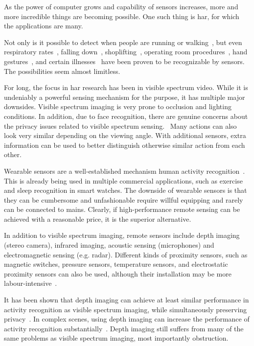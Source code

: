 As the power of computer grows and capability of sensors increases,
more and more incredible things are becoming possible.
One such thing is \gls{har},
for which the applications are many.

Not only is it possible to detect when people are running or walking~\cite{running-walking},
but even respiratory rates~\cite{breathing}, falling down~\cite{falling}, shoplifting~\cite{shoplifting},
operating room procedures~\cite{operatingroom}, hand gestures~\cite{handgestures},
and certain illnesses~\cite{parkinsson} have been proven to be recognizable by sensors.
The possibilities seem almost limitless.

For long, the focus in \gls{har} research has been in visible spectrum video.
While it is undeniably a powerful sensing mechanism for the purpose,
it has multiple major downsides.
Visible spectrum imaging is very prone to occlusion and lighting conditions.
In addition, due to face recognition, there are genuine concerns about the privacy issues related to visible spectrum sensing.~\cite{sensing-survey}
Many actions can also look very similar depending on the viewing angle.
With additional sensors, extra information can be used to better distinguish otherwise similar action from each other.

Wearable sensors are a well-established mechanism human activity recognition~\cite{wearables}.
This is already being used in multiple commercial applications,
such as exercise and sleep recognition in smart watches.
The downside of wearable sensors is that they can be cumbersome and unfashionable
require willful equipping and rarely can be connected to mains.
Clearly, if high-performance remote sensing can be achieved with a reasonable price,
it is the superior alternative.

In addition to visible spectrum imaging,
remote sensors include depth imaging (stereo camera),
infrared imaging, acoustic sensing (microphones) and electromagnetic sensing (e.g. radar).
Different kinds of proximity sensors, such as magnetic switches, pressure sensors, temperature sensors,
and electrostatic proximity sensors can also be used,
although their installation may be more labour-intensive~\cite{sensing-survey}.

It has been shown that depth imaging can achieve at least similar performance in activity recognition as visible spectrum imaging,
while simultaneously preserving privacy~\cite{depth}.
In complex scenes, using depth imaging can increase the performance of activity recognition substantially~\cite{depth-2}.
Depth imaging still suffers from many of the same problems as visible spectrum imaging,
most importantly obstruction.

